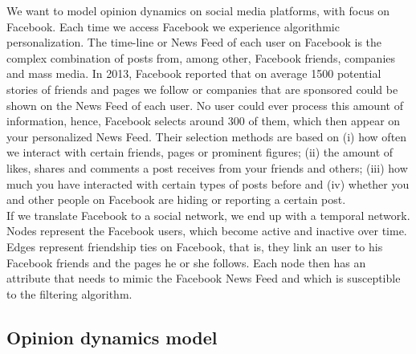 \documentclass[11 pt , letterpaper , twoside , openright]{book}
\begin{document}
We want to model opinion dynamics on social media platforms, with focus on Facebook. Each time we access Facebook we experience algorithmic personalization. The time-line or News Feed of each user on Facebook is the complex combination of posts from, among other, Facebook friends, companies and mass media. In 2013, Facebook reported that on average 1500 potential stories of friends and pages we follow or companies that are sponsored could be shown on the News Feed of each user. %
No user could ever process this amount of information, hence, Facebook selects around 300 of them, which then appear on your personalized News Feed. Their selection methods are based on (i) how often we interact with certain friends, pages or prominent figures; (ii) the amount of likes, shares and comments a post receives from your friends and others; (iii) how much you have interacted with certain types of posts before and (iv) whether you and other people on Facebook are hiding or reporting a certain post. \\
\newline
If we translate Facebook to a social network, we end up with a temporal network. Nodes represent the Facebook users, which become active and inactive over time. Edges represent friendship ties on Facebook, that is, they link an user to his Facebook friends and the pages he or she follows. Each node then has an attribute that needs to mimic the Facebook News Feed and which is susceptible to the filtering algorithm.

\subsection{Opinion dynamics model}
\end{document}
